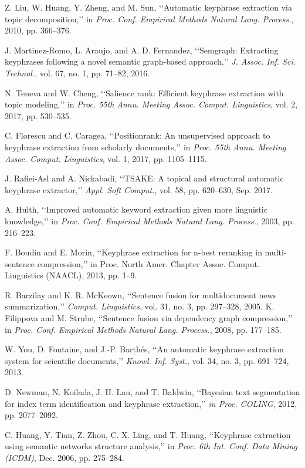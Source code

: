 \documentclass{ieeeaccess}
\begin{document}
\begin{thebibliography}{00}
Z. Liu, W. Huang, Y. Zheng, and M. Sun, ‘‘Automatic keyphrase extraction
via topic decomposition,’’ in \textit{Proc. Conf. Empirical Methods Natural Lang.
Process.}, 2010, pp. 366–376.

J. Martinez-Romo, L. Araujo, and A. D. Fernandez, ‘‘Semgraph: Extracting keyphrases following a novel semantic graph-based approach,’’
\textit{J. Assoc. Inf. Sci. Technol.}, vol. 67, no. 1, pp. 71–82, 2016.

N. Teneva and W. Cheng, ‘‘Salience rank: Efficient keyphrase extraction
with topic modeling,’’ in \textit{Proc. 55th Annu. Meeting Assoc. Comput. Linguistics}, vol. 2, 2017, pp. 530–535.

C. Florescu and C. Caragea, ‘‘Positionrank: An unsupervised approach
to keyphrase extraction from scholarly documents,’’ in \textit{Proc. 55th Annu.
Meeting Assoc. Comput. Linguistics}, vol. 1, 2017, pp. 1105–1115.

J. Rafiei-Asl and A. Nickabadi, ‘‘TSAKE: A topical and structural automatic keyphrase extractor,’’ \textit{Appl. Soft Comput.}, vol. 58, pp. 620–630,
Sep. 2017.

A. Hulth, ‘‘Improved automatic keyword extraction given more linguistic
knowledge,’’ in \textit{Proc. Conf. Empirical Methods Natural Lang. Process.},
2003, pp. 216–223.

F. Boudin and E. Morin, ‘‘Keyphrase extraction for n-best reranking in
multi-sentence compression,’’ in Proc. North Amer. Chapter Assoc. Comput. Linguistics (NAACL), 2013, pp. 1–9.

R. Barzilay and K. R. McKeown, ‘‘Sentence fusion for multidocument
news summarization,’’ \textit{Comput. Linguistics}, vol. 31, no. 3, pp. 297–328,
2005.
K. Filippova and M. Strube, ‘‘Sentence fusion via dependency graph
compression,’’ in \textit{Proc. Conf. Empirical Methods Natural Lang. Process.},
2008, pp. 177–185.

W. You, D. Fontaine, and J.-P. Barthés, ‘‘An automatic keyphrase extraction system for scientific documents,’’ \textit{Knowl. Inf. Syst.}, vol. 34, no. 3,
pp. 691–724, 2013.

D. Newman, N. Koilada, J. H. Lau, and T. Baldwin, ‘‘Bayesian text
segmentation for index term identification and keyphrase extraction,’’ \textit{in
Proc. COLING}, 2012, pp. 2077–2092.

C. Huang, Y. Tian, Z. Zhou, C. X. Ling, and T. Huang, ‘‘Keyphrase
extraction using semantic networks structure analysis,’’ in \textit{Proc. 6th Int.
Conf. Data Mining (ICDM)}, Dec. 2006, pp. 275–284.


\end{thebibliography}
\end{document}
